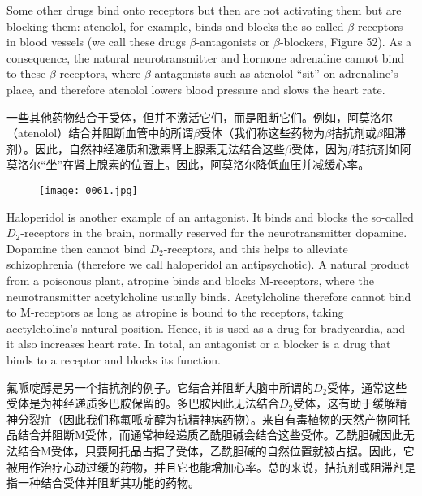 \documentclass[dvipsnames, svgnames,a4paper,11pt]{article}
\begin{document}
Some other drugs bind onto receptors but then are not activating them but are blocking them: atenolol, for example, binds and blocks the so-called $\beta$-receptors in blood vessels (we call these drugs $\beta$-antagonists or $\beta$-blockers, Figure 52). As a consequence, the natural neurotransmitter and hormone adrenaline cannot bind to these $\beta$-receptors, where $\beta$-antagonists such as atenolol “sit” on adrenaline’s place, and therefore atenolol lowers blood pressure and slows the heart rate.  

一些其他药物结合于受体，但并不激活它们，而是阻断它们。例如，阿莫洛尔（atenolol）结合并阻断血管中的所谓$\beta$受体（我们称这些药物为$\beta$拮抗剂或$\beta$阻滞剂）。因此，自然神经递质和激素肾上腺素无法结合这些$\beta$受体，因为$\beta$拮抗剂如阿莫洛尔“坐”在肾上腺素的位置上。因此，阿莫洛尔降低血压并减缓心率。

\begin{figure}[ht]
    \centering
    \texttt{[image: 0061.jpg]}
     \label{fig52B}
\end{figure}

Haloperidol is another example of an antagonist. It binds and blocks the so-called $D_2$-receptors in the brain, normally reserved for the neurotransmitter dopamine. Dopamine then cannot bind $D_2$-receptors, and this helps to alleviate schizophrenia (therefore we call haloperidol an antipsychotic). A natural product from a poisonous plant, atropine binds and blocks M-receptors, where the neurotransmitter acetylcholine usually binds. Acetylcholine therefore cannot bind to M-receptors as long as atropine is bound to the receptors, taking acetylcholine’s natural position. Hence, it is used as a drug for bradycardia, and it also increases heart rate. In total, an antagonist or a blocker is a drug that binds to a receptor and blocks its function.

氟哌啶醇是另一个拮抗剂的例子。它结合并阻断大脑中所谓的$D_2$受体，通常这些受体是为神经递质多巴胺保留的。多巴胺因此无法结合$D_2$受体，这有助于缓解精神分裂症（因此我们称氟哌啶醇为抗精神病药物）。来自有毒植物的天然产物阿托品结合并阻断M受体，而通常神经递质乙酰胆碱会结合这些受体。乙酰胆碱因此无法结合M受体，只要阿托品占据了受体，乙酰胆碱的自然位置就被占据。因此，它被用作治疗心动过缓的药物，并且它也能增加心率。总的来说，拮抗剂或阻滞剂是指一种结合受体并阻断其功能的药物。
\end{document}
